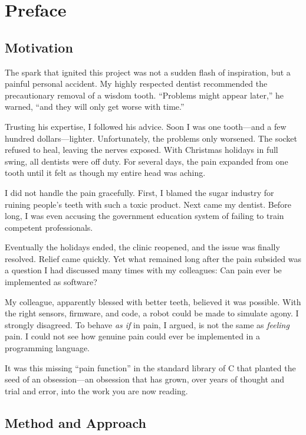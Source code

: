 \chapter{Preface}
\label{chap:preface}

\section*{Motivation}

The spark that ignited this project was not a sudden flash of inspiration, but a painful personal accident.
My highly respected dentist recommended the precautionary removal of a wisdom tooth. ``Problems might appear later,'' he warned, ``and they will only get worse with time.''

Trusting his expertise, I followed his advice.
Soon I was one tooth---and a few hundred dollars---lighter.
Unfortunately, the problems only worsened.
The socket refused to heal, leaving the nerves exposed.
With Christmas holidays in full swing, all dentists were off duty.
For several days, the pain expanded from one tooth until it felt as though my entire head was aching.

I did not handle the pain gracefully. First, I blamed the sugar industry for ruining people’s teeth with such a toxic product.
Next came my dentist. Before long, I was even accusing the government education system of failing to train competent professionals.

Eventually the holidays ended, the clinic reopened, and the issue was finally resolved.
Relief came quickly.
Yet what remained long after the pain subsided was a question I had discussed many times with my colleagues: Can pain ever be implemented as software?

My colleague, apparently blessed with better teeth, believed it was possible.
With the right sensors, firmware, and code, a robot could be made to simulate agony.
I strongly disagreed.
To behave \emph{as if} in pain, I argued, is not the same as \emph{feeling} pain.
I could not see how genuine pain could ever be implemented in a programming language.

It was this missing ``pain function'' in the standard library of C that planted the seed of an obsession---an obsession that has grown, over years of thought and trial and error, into the work you are now reading.

\section*{Method and Approach}

